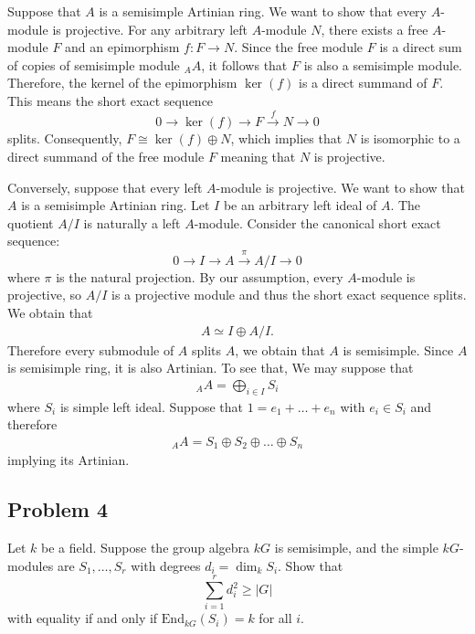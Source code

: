 \begin{solution}
   Suppose that $A$ is a semisimple Artinian ring. We want to show that every $A$-module is projective.
    For any arbitrary left $A$-module $N$, there exists a free $A$-module $F$ and an epimorphism $f: F \to N$. 
    Since the free module $F$ is a direct sum of copies of semisimple module $_A A$, it follows that $F$ is also a semisimple module. 
    Therefore, the kernel of the epimorphism $\ker(f)$ is a direct summand of $F$. This means the short exact sequence 
$$ 0 \to \ker(f) \to F \xrightarrow{f} N \to 0 $$
splits. Consequently, $F \cong \ker(f) \oplus N$, which implies that $N$ is isomorphic to a direct summand of the free module $F$ meaning that $N$ is projective.

Conversely, suppose that every left $A$-module is projective. We want to show that $A$ is a semisimple Artinian ring.
Let $I$ be an arbitrary left ideal of $A$. The quotient $A/I$ is naturally a left $A$-module. Consider the canonical short exact sequence:
$$ 0 \to I \to A \xrightarrow{\pi} A/I \to 0 $$
where $\pi$ is the natural projection. By our assumption, every $A$-module is projective, so $A/I$ is a projective module 
and thus the short exact sequence splits. We obtain that 
\begin{align*}
    A \simeq I \oplus A/I.
\end{align*}
Therefore every submodule of $A$ splits $A$, we obtain that $A$ is semisimple. Since $A$ is semisimple ring, it is also Artinian. To see that, We may suppose that 
\begin{align*}
   _A A = \bigoplus_{i \in I} S_i
\end{align*} 
where $S_i$ is simple left ideal. Suppose that $1=e_1+\dots+e_n$ with $e_i\in S_i$ and therefore
\begin{align*}
    _A A = S_1 \oplus S_2 \oplus \dots \oplus S_n
\end{align*}
implying its Artinian.
\end{solution}


\subsection*{Problem 4}

Let $k$ be a field. Suppose the group algebra $kG$ is semisimple, and the simple $kG$-modules are $S_1, \dots, S_r$ with degrees $d_i = \dim_k S_i$. Show that
\[ \sum_{i=1}^{r} d_i^2 \geq |G| \]
with equality if and only if $\text{End}_{kG}(S_i) = k$ for all $i$.

